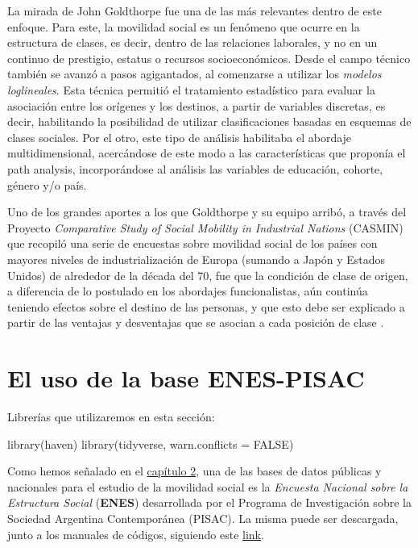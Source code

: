 \documentclass[
]{book}
\newenvironment{Shaded}{\begin{snugshade}}{\end{snugshade}}
\newcommand{\AttributeTok}[1]{\textcolor[rgb]{0.77,0.63,0.00}{#1}}
\newcommand{\ConstantTok}[1]{\textcolor[rgb]{0.00,0.00,0.00}{#1}}
\newcommand{\FunctionTok}[1]{\textcolor[rgb]{0.00,0.00,0.00}{#1}}
\newcommand{\NormalTok}[1]{#1}
\begin{document}
La mirada de John Goldthorpe fue una de las más relevantes dentro de este enfoque. Para este, la movilidad social es un fenómeno que ocurre en la estructura de clases, es decir, dentro de las relaciones laborales, y no en un continuo de prestigio, estatus o recursos socioeconómicos. Desde el campo técnico también se avanzó a pasos agigantados, al comenzarse a utilizar los \emph{modelos loglineales}. Esta técnica permitió el tratamiento estadístico para evaluar la asociación entre los orígenes y los destinos, a partir de variables discretas, es decir, habilitando la posibilidad de utilizar clasificaciones basadas en esquemas de clases sociales. Por el otro, este tipo de análisis habilitaba el abordaje multidimensional, acercándose de este modo a las características que proponía el path analysis, incorporándose al análisis las variables de educación, cohorte, género y/o país.

Uno de los grandes aportes a los que Goldthorpe y su equipo arribó, a través del Proyecto \emph{Comparative Study of Social Mobility in Industrial Nations} (CASMIN) que recopiló una serie de encuestas sobre movilidad social de los países con mayores niveles de industrialización de Europa (sumando a Japón y Estados Unidos) de alrededor de la década del 70, fue que la condición de clase de origen, a diferencia de lo postulado en los abordajes funcionalistas, aún continúa teniendo efectos sobre el destino de las personas, y que esto debe ser explicado a partir de las ventajas y desventajas que se asocian a cada posición de clase \citep{Erikson.Goldthorpe2002}.

\hypertarget{enes}{%
\section{El uso de la base ENES-PISAC}\label{enes}}

Librerías que utilizaremos en esta sección:

\begin{Shaded}
\begin{Highlighting}[]
\FunctionTok{library}\NormalTok{(haven)}
\FunctionTok{library}\NormalTok{(tidyverse, }\AttributeTok{warn.conflicts =} \ConstantTok{FALSE}\NormalTok{)}
\end{Highlighting}
\end{Shaded}

Como hemos señalado en el \protect\hyperlink{otras}{capítulo 2}, una de las bases de datos públicas y nacionales para el estudio de la movilidad social es la \emph{Encuesta Nacional sobre la Estructura Social} (\textbf{ENES}) desarrollada por el Programa de Investigación sobre la Sociedad Argentina Contemporánea (PISAC). La misma puede ser descargada, junto a los manuales de códigos, siguiendo este \href{http://pisac.mincyt.gob.ar/datos.php}{link}.
\end{document}
